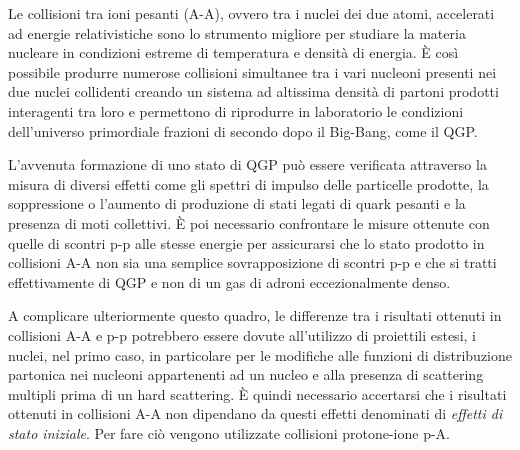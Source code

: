     Le collisioni tra ioni pesanti (A-A), ovvero tra i nuclei dei due atomi, accelerati ad energie relativistiche sono lo strumento migliore per studiare la materia nucleare in condizioni estreme di temperatura e densità di energia. È così possibile produrre numerose collisioni simultanee tra i vari nucleoni presenti nei due nuclei collidenti creando un sistema ad altissima densità di partoni prodotti interagenti tra loro e permettono di riprodurre in laboratorio le condizioni dell'universo primordiale frazioni di secondo dopo il Big-Bang, come il QGP.

    L'avvenuta formazione di uno stato di QGP può essere verificata attraverso la misura di diversi effetti come gli spettri di impulso delle particelle prodotte, la soppressione o l'aumento di produzione di stati legati di quark pesanti e la presenza di moti collettivi. È poi necessario confrontare le misure ottenute con quelle di scontri p-p alle stesse energie per assicurarsi che lo stato prodotto in collisioni A-A non sia una semplice sovrapposizione di scontri p-p e che si tratti effettivamente di QGP e non di un gas di adroni eccezionalmente denso.

    A complicare ulteriormente questo quadro, le differenze tra i risultati ottenuti in collisioni A-A e p-p potrebbero essere dovute all'utilizzo di proiettili estesi, i nuclei, nel primo caso, in particolare per le modifiche alle funzioni di distribuzione partonica nei nucleoni appartenenti ad un nucleo e alla presenza di scattering multipli prima di un hard scattering. È quindi necessario accertarsi che i risultati ottenuti in collisioni A-A non dipendano da questi effetti denominati di \textit{effetti di stato iniziale}. Per fare ciò vengono utilizzate collisioni protone-ione p-A.

